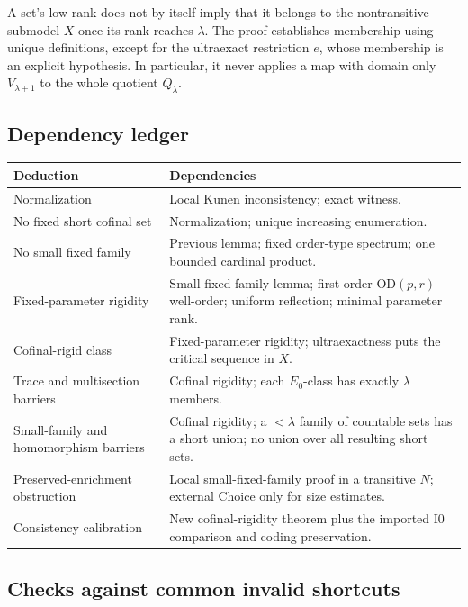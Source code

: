 \documentclass[11pt,letterpaper]{article}
\theoremstyle{definition}
\numberwithin{equation}{section}
\newcommand{\OD}{\mathrm{OD}}
\newcommand{\Izero}{\mathrm{I0}}
\newcommand{\Q}{Q_\lambda}
\begin{document}
A set's low rank does not by itself imply that it belongs to the nontransitive submodel $X$ once its rank reaches $\lambda$. The proof establishes membership using unique definitions, except for the ultraexact restriction $e$, whose membership is an explicit hypothesis. In particular, it never applies a map with domain only $V_{\lambda+1}$ to the whole quotient $\Q$.

\subsection{Dependency ledger}

\begin{center}
\begin{tabularx}{\textwidth}{@{}P{.29\textwidth}Y@{}}
\toprule
\textbf{Deduction} & \textbf{Dependencies}\\
\midrule
Normalization & Local Kunen inconsistency; exact witness.\\
No fixed short cofinal set & Normalization; unique increasing enumeration.\\
No small fixed family & Previous lemma; fixed order-type spectrum; one bounded cardinal product.\\
Fixed-parameter rigidity & Small-fixed-family lemma; first-order $\OD(p,r)$ well-order; uniform reflection; minimal parameter rank.\\
Cofinal-rigid class & Fixed-parameter rigidity; ultraexactness puts the critical sequence in $X$.\\
Trace and multisection barriers & Cofinal rigidity; each $E_0$-class has exactly $\lambda$ members.\\
Small-family and homomorphism barriers & Cofinal rigidity; a $<\lambda$ family of countable sets has a short union; no union over all resulting short sets.\\
Preserved-enrichment obstruction & Local small-fixed-family proof in a transitive $N$; external Choice only for size estimates.\\
Consistency calibration & New cofinal-rigidity theorem plus the imported $\Izero$ comparison and coding preservation.\\
\bottomrule
\end{tabularx}
\end{center}

\subsection{Checks against common invalid shortcuts}
\end{document}
